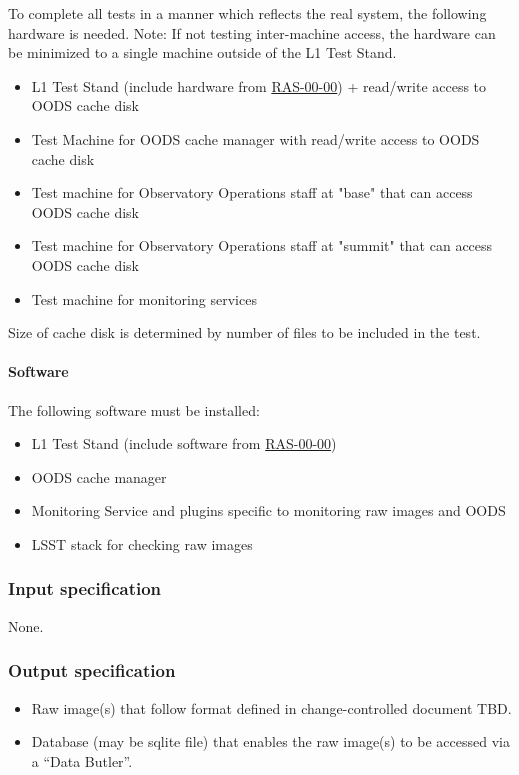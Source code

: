 \documentclass[DM,lsstdraft,STS,toc]{lsstdoc}
\begin{document}
To complete all tests in a manner which reflects the real system,
the following hardware is needed.  Note: If not testing inter-machine access, the hardware can be minimized to a single machine outside of the L1 Test Stand.


\begin{itemize}
\item{L1 Test Stand (include hardware from \hyperref[ras-00-00]{RAS-00-00}) + read/write access to OODS cache disk}
\item{Test Machine for OODS cache manager with read/write access to OODS cache disk}
\item{Test machine for Observatory Operations staff at "base" that can access OODS cache disk}
\item{Test machine for Observatory Operations staff at "summit" that can access OODS cache disk}
\item{Test machine for monitoring services}
\end{itemize}


Size of cache disk is determined by number of files to be included in the test.






\paragraph{Software}


The following software must be installed:
\begin{itemize}
\item{L1 Test Stand (include software from \hyperref[ras-00-00]{RAS-00-00})}
\item{OODS cache manager}
\item{Monitoring Service and plugins specific to monitoring raw images and OODS}
\item{LSST stack for checking raw images}
\end{itemize}




\subsubsection{Input specification}


None.


\subsubsection{Output specification}
\begin{itemize}
\item{Raw image(s) that follow format defined in change-controlled document TBD.}
\item{Database (may be sqlite file) that enables the raw image(s) to be accessed via a ``Data Butler''.}
\end{itemize}
\end{document}
